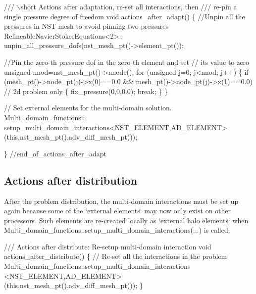  
\begin{DoxyCodeInclude}
 \textcolor{comment}{/// \(\backslash\)short Actions after adaptation, re-set all interactions, then}
\textcolor{comment}{ /// re-pin a single pressure degree of freedom}
\textcolor{comment}{} \textcolor{keywordtype}{void} actions\_after\_adapt()
  \{
   \textcolor{comment}{//Unpin all the pressures in NST mesh to avoid pinning two pressures}
   RefineableNavierStokesEquations<2>::
    unpin\_all\_pressure\_dofs(nst\_mesh\_pt()->element\_pt());

   \textcolor{comment}{//Pin the zero-th pressure dof in the zero-th element and set}
   \textcolor{comment}{// its value to zero}
   \textcolor{keywordtype}{unsigned} nnod=nst\_mesh\_pt()->nnode();
   \textcolor{keywordflow}{for} (\textcolor{keywordtype}{unsigned} j=0; j<nnod; j++)
    \{
     \textcolor{keywordflow}{if} (mesh\_pt()->node\_pt(j)->x(0)==0.0 && 
         mesh\_pt()->node\_pt(j)->x(1)==0.0) \textcolor{comment}{// 2d problem only}
      \{
       fix\_pressure(0,0,0.0);
       \textcolor{keywordflow}{break};
      \}
    \}

   \textcolor{comment}{// Set external elements for the multi-domain solution.}
   Multi\_domain\_functions::
    setup\_multi\_domain\_interactions<NST\_ELEMENT,AD\_ELEMENT>
    (\textcolor{keyword}{this},nst\_mesh\_pt(),adv\_diff\_mesh\_pt());
 
  \} \textcolor{comment}{//end\_of\_actions\_after\_adapt}

\end{DoxyCodeInclude}




\hypertarget{index_actions_after_distribute}{}\subsection{Actions after distribution}\label{index_actions_after_distribute}
After the problem distribution, the multi-\/domain interactions must be set up again because some of the \char`\"{}external elements\char`\"{} may now only exist on other processors. Such elements are re-\/created locally as \char`\"{}external halo elements\char`\"{} when {\ttfamily Multi\+\_\+domain\+\_\+functions\+::setup\+\_\+multi\+\_\+domain\+\_\+interactions}(...) is called.

 
\begin{DoxyCodeInclude}
 \textcolor{comment}{/// Actions after distribute: Re-setup multi-domain interaction}
 \textcolor{keywordtype}{void} actions\_after\_distribute()
  \{
   \textcolor{comment}{// Re-set all the interactions in the problem}
   Multi\_domain\_functions::setup\_multi\_domain\_interactions
    <NST\_ELEMENT,AD\_ELEMENT>(\textcolor{keyword}{this},nst\_mesh\_pt(),adv\_diff\_mesh\_pt());
  \} 

\end{DoxyCodeInclude}




